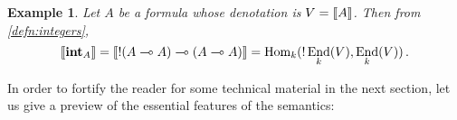\documentclass[english,letter paper,12pt,reqno]{article}
\theoremstyle{example}
\newtheorem{example}[theorem]{Example}
\newtheorem{remark}[theorem]{Remark}
\numberwithin{equation}{section}
\def\Hom{\operatorname{Hom}}
\DeclareMathOperator{\End}{End}
\def\inta{\bold{int}}
\begin{document}



\begin{example}\label{example:denotation_2}  Let $A$ be a formula whose denotation is $V = \llbracket A \rrbracket$. Then from \eqref{defn:integers},
\[
\den{\inta_A} = \den{ {!}( A \multimap A) \multimap (A \multimap A)} = \Hom_k( {!} \End_k(V), \End_k(V) )\,.
\]
\end{example}

In order to fortify the reader for some technical material in the next section, let us give a preview of the essential features of the semantics:
\end{document}
